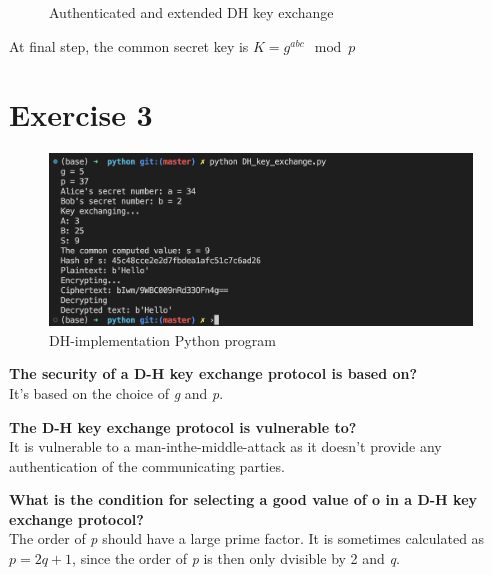 \documentclass{article}
\begin{document}
\begin{figure}[!hpt]

    \caption{Authenticated and extended DH key exchange \cite{3_exchange}\cite{course_slides}}
\end{figure}

At final step, the common secret key is \(K = g^{abc} \mod p\)

\section*{Exercise 3}
%
\begin{figure}[!hpt]
    \centering
    \includegraphics[width=\textwidth, height=\textheight, keepaspectratio]{DH_implementation.png}
    \caption{DH-implementation Python program}
\end{figure}

\textbf{The security of a D-H key exchange protocol is based on?}\\
It's based on the choice of \emph{g} and \emph{p}.

\textbf{The D-H key exchange protocol is vulnerable to?}\\
It is vulnerable to a man-inthe-middle-attack as it doesn't provide
any authentication of the communicating parties.

\textbf{What is the condition for selecting a good value of o in a D-H key exchange protocol?}\\
The order of \emph{p} should have a large prime factor. It is sometimes
calculated as \(p = 2q + 1\), since the order of \emph{p} is then only dvisible
by 2 and \emph{q}.

\printbibliography{}
\end{document}
